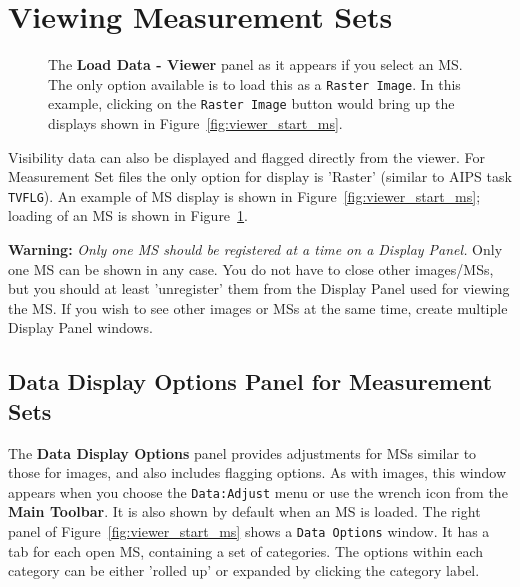 \section{Viewing Measurement Sets}
\label{section:display.ms}

\begin{figure}[h!]
\begin{center}
\caption{\label{fig:viewer_load_ms} The {\bf Load Data - Viewer} panel
as it appears if you select an MS.  The only option available is
to load this as a {\tt Raster Image}.  In this example, clicking
on the {\tt Raster Image} button would bring up the displays shown
in Figure~\ref{fig:viewer_start_ms}.}
\hrulefill
\end{center}
\end{figure}

Visibility data can also be displayed and flagged directly from the
viewer. For Measurement Set files the only option for display is 'Raster'
(similar to AIPS task {\tt TVFLG}).  An example of MS display is
shown in Figure~\ref{fig:viewer_start_ms}; loading of an
MS is shown in Figure~\ref{fig:viewer_load_ms}.  

{\bf Warning:} {\em Only one MS should be registered at a time on a
Display Panel.} 
Only one MS can be shown in any case.  
You do not have to close other images/MSs, but you should at
least 'unregister' them from the Display Panel used for viewing the MS.
If you wish to see other images or MSs at the same time, create multiple
Display Panel windows.

 


\subsection{Data Display Options Panel for Measurement Sets}
\label{section:display.ms.adjust}

The {\bf Data Display Options} panel provides adjustments for MSs
similar to those for images, and also includes flagging options.
As with images, this window appears when you choose the {\tt Data:Adjust}
menu or use the wrench icon from the {\bf Main Toolbar}. It is also shown
by default when an MS is loaded. The right panel
of Figure~\ref{fig:viewer_start_ms} shows a {\tt Data Options} window. 
It has a tab for each open MS, containing a set of categories.  The
options within each category can be either 'rolled up' or expanded by
clicking the category label.

